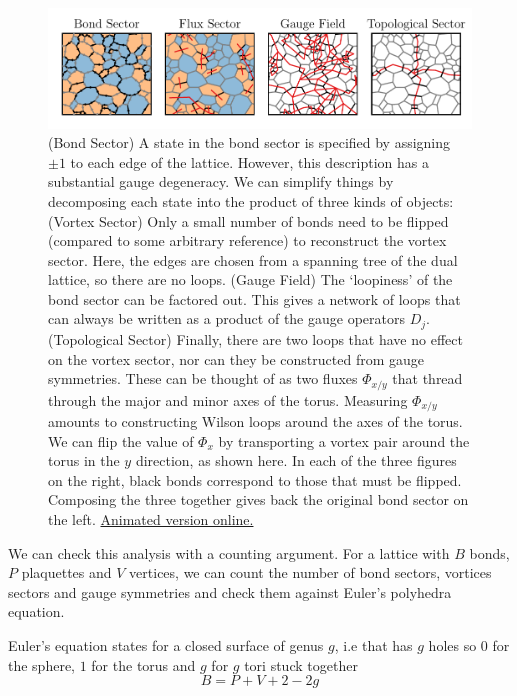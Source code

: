 \begin{figure}
\hypertarget{fig:state_decomposition_animated}{%
\centering
\includegraphics[width=1\textwidth,height=\textheight]{figure_code/amk_chapter/intro/state_decomposition_animated/state_decomposition_animated}
\caption[State Decomposition]{(Bond Sector) A state in the bond sector is specified by
assigning \(\pm 1\) to each edge of the lattice. However, this
description has a substantial gauge degeneracy. We can simplify things
by decomposing each state into the product of three kinds of objects:
(Vortex Sector) Only a small number of bonds need to be flipped
(compared to some arbitrary reference) to reconstruct the vortex sector.
Here, the edges are chosen from a spanning tree of the dual lattice, so
there are no loops. (Gauge Field) The `loopiness' of the bond sector can
be factored out. This gives a network of loops that can always be
written as a product of the gauge operators \(D_j\). (Topological
Sector) Finally, there are two loops that have no effect on the vortex
sector, nor can they be constructed from gauge symmetries. These can be
thought of as two fluxes \(\Phi_{x/y}\) that thread through the major
and minor axes of the torus. Measuring \(\Phi_{x/y}\) amounts to
constructing Wilson loops around the axes of the torus. We can flip the
value of \(\Phi_{x}\) by transporting a vortex pair around the torus in
the \(y\) direction, as shown here. In each of the three figures on the
right, black bonds correspond to those that must be flipped. Composing
the three together gives back the original bond sector on the left.
\href{http://thomashodson.com/assets/thesis/figure_code/amk_chapter/intro/state_decomposition_animated/state_decomposition_animated.gif}{ Animated version online.}}\label{fig:state_decomposition_animated}
}
\end{figure}

We can check this analysis with a counting argument. For a lattice with \(B\) bonds, \(P\) plaquettes and \(V\) vertices, we can count the number of bond sectors, vortices sectors and gauge symmetries and check them against Euler's polyhedra equation.

Euler's equation states for a closed surface of genus \(g\), i.e that has \(g\) holes so \(0\) for the sphere, \(1\) for the torus and \(g\) for \(g\) tori stuck together \[B = P + V + 2 - 2g\]

